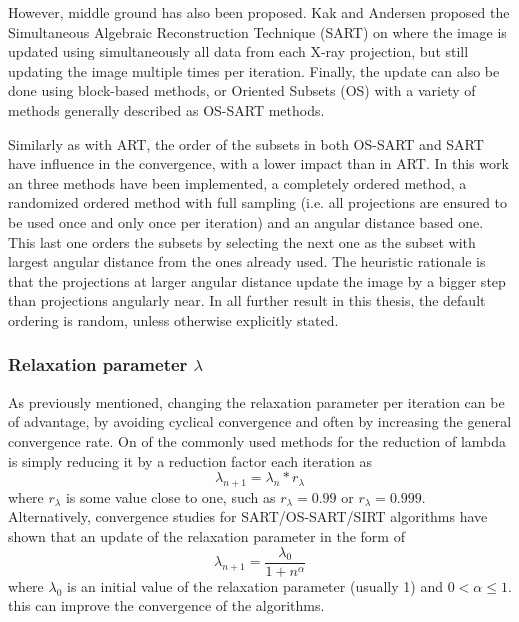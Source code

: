 However, middle ground has also been proposed. Kak and Andersen proposed\cite{SART} the Simultaneous Algebraic Reconstruction Technique (SART) on where the image is updated using simultaneously all data from each X-ray projection, but still updating the image multiple times per iteration. Finally, the update can also be done using block-based methods, or Oriented Subsets (OS) with a variety of methods generally described as OS-SART\cite{OS_SART} methods.

 Similarly as with ART, the order of the subsets in both OS-SART and SART have influence in the convergence, with a lower impact than in ART. In this work an three methods have been implemented, a completely ordered method, a randomized ordered method with full sampling (i.e. all projections are ensured to be used once and only once per iteration) and an angular distance based one. This last one orders the subsets by selecting the next one as the subset with largest angular distance from the ones already used. The heuristic rationale is that the projections at larger angular distance update the image by a bigger step than projections angularly near. In all further result in this thesis, the default ordering is random, unless otherwise explicitly stated.
 



\subsubsection{Relaxation parameter $\lambda$}

As previously mentioned, changing the relaxation parameter per iteration can be of advantage, by avoiding cyclical convergence and often by increasing the general convergence rate. On of the commonly used methods for the reduction of lambda is simply reducing it by a reduction factor each iteration as
\begin{equation}
\lambda_{n+1}=\lambda_n*r_\lambda
\end{equation}
where $r_\lambda$ is some value close to one, such as $r_\lambda=0.99$ or $r_\lambda=0.999$. Alternatively, convergence studies for SART/OS-SART/SIRT algorithms have shown\cite{jiang2003convergence} that an update of the relaxation parameter in the form of
\begin{equation}
\lambda_{n+1}=\frac{\lambda_0}{1+n^\alpha}
\end{equation}
where $\lambda_0$ is an initial value of the relaxation parameter (usually 1) and $0<\alpha\leq 1$. this can improve the convergence of the algorithms. 

